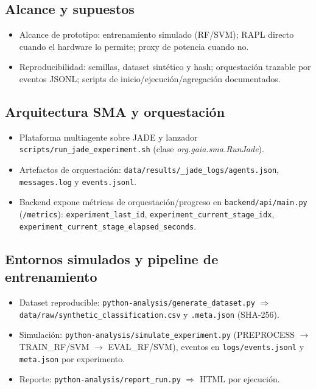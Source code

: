\subsection*{Alcance y supuestos}
\begin{itemize}
  \item Alcance de prototipo: entrenamiento simulado (RF/SVM); RAPL directo cuando el hardware lo permite; proxy de potencia cuando no.
  \item Reproducibilidad: semillas, dataset sintético y hash; orquestación trazable por eventos JSONL; scripts de inicio/ejecución/agregación documentados.
\end{itemize}

\subsection*{Arquitectura SMA y orquestación}
\begin{itemize}
  \item Plataforma multiagente sobre JADE y lanzador \verb|scripts/run_jade_experiment.sh| (clase \emph{org.gaia.sma.RunJade}).
  \item Artefactos de orquestación: \verb|data/results/_jade_logs/agents.json|, \verb|messages.log| y \verb|events.jsonl|.
  \item Backend expone métricas de orquestación/progreso en \verb|backend/api/main.py| (\verb|/metrics|): \verb|experiment_last_id|, \verb|experiment_current_stage_idx|, \verb|experiment_current_stage_elapsed_seconds|.
\end{itemize}

\subsection*{Entornos simulados y pipeline de entrenamiento}
\begin{itemize}
  \item Dataset reproducible: \verb|python-analysis/generate_dataset.py| $\Rightarrow$ \verb|data/raw/synthetic_classification.csv| y \verb|.meta.json| (SHA-256).
  \item Simulación: \verb|python-analysis/simulate_experiment.py| (PREPROCESS $\rightarrow$ TRAIN\_RF/SVM $\rightarrow$ EVAL\_RF/SVM), eventos en \verb|logs/events.jsonl| y \verb|meta.json| por experimento.
  \item Reporte: \verb|python-analysis/report_run.py| $\Rightarrow$ HTML por ejecución.
\end{itemize}

